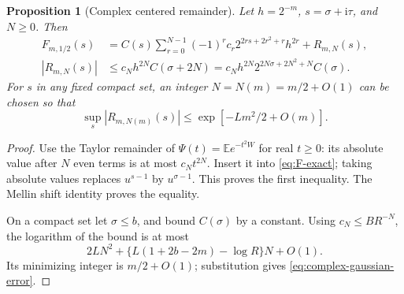 \documentclass[11pt,a4paper]{article}
\numberwithin{equation}{section}
\newtheorem{proposition}[proposition]{Proposition}
\theoremstyle{definition}
\theoremstyle{remark}
\newcommand{\E}{\mathbb E}
\newcommand{\ii}{\mathrm i}
\newcommand{\abs}[1]{\left|#1\right|}
\begin{document}
\begin{proposition}[Complex centered remainder]
\label{prop:complex-center}
Let $h=2^{-m}$, $s=\sigma+\ii\tau$, and $N\ge0$. Then
\begin{align}
 F_{m,1/2}(s)
 &=C(s)\sum_{r=0}^{N-1}(-1)^rc_r
         2^{2rs+2r^2+r}h^{2r}+R_{m,N}(s),
 \label{eq:center-complex-expansion}\\
 \abs{R_{m,N}(s)}
 &\le c_Nh^{2N}C(\sigma+2N)
 =c_Nh^{2N}2^{2N\sigma+2N^2+N}C(\sigma).
 \label{eq:center-complex-bound}
\end{align}
For $s$ in any fixed compact set, an integer $N=N(m)=m/2+O(1)$
can be chosen so that
\begin{equation}
 \sup_s\abs{R_{m,N(m)}(s)}
 \le \exp[-Lm^2/2+O(m)].
 \label{eq:complex-gaussian-error}
\end{equation}
\end{proposition}
\begin{proof}
Use the Taylor remainder of $\Psi(t)=\E e^{-t^2W}$ for real $t\ge0$:
its absolute value after $N$ even terms is at most $c_Nt^{2N}$.
Insert it into \cref{eq:F-exact}; taking absolute values replaces
$u^{s-1}$ by $u^{\sigma-1}$. This proves the first inequality.
The Mellin shift identity proves the equality.

On a compact set let $\sigma\le b$, and bound $C(\sigma)$ by a
constant. Using $c_N\le BR^{-N}$, the logarithm of the bound is at
most
\[
 2LN^2+\{L(1+2b-2m)-\log R\}N+O(1).
\]
Its minimizing integer is $m/2+O(1)$; substitution gives
\cref{eq:complex-gaussian-error}.
\end{proof}
\end{document}

